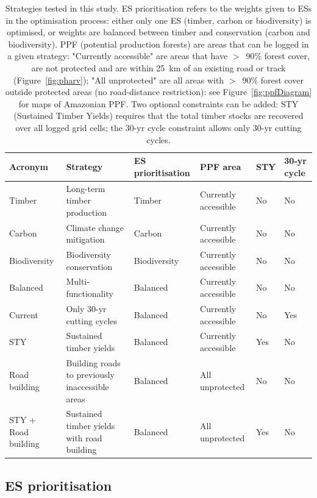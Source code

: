 \documentclass{article}
\begin{document}
\begin{table}
    \centering
    \begin{tabularx}{\textwidth}{p{2cm} p{4.5cm} p{2cm} p{3.5cm} p{0.8cm} p{1cm}}
    \toprule
         Acronym & Strategy & ES prioritisation & PPF area &  STY & 30-yr cycle \\
         \midrule
         Timber & Long-term timber production & Timber  & Currently accessible & No & No\\
         Carbon & Climate change mitigation &  Carbon & Currently accessible & No & No\\
         Biodiversity & Biodiversity conservation &  Biodiversity & Currently accessible & No & No \\
         Balanced & Multi-functionality & Balanced & Currently accessible & No & No \\
         Current & Only 30-yr cutting cycles & Balanced & Currently accessible & No & Yes \\
         STY & Sustained timber yields & Balanced & Currently accessible & Yes & No \\
         Road building & Building roads to previously inaccessible areas & Balanced & All unprotected & No & No \\
         STY + Road building & Sustained timber yields with road building & Balanced & All unprotected & Yes & No \\
         \bottomrule
    \end{tabularx}
    \caption{Strategies tested in this study. ES prioritisation refers to the weights given to ESs in the optimisation process: either only one ES (timber, carbon or biodiversity) is optimised, or weights are balanced between timber and conservation (carbon and biodiversity). PPF (potential production forests) are areas that can be logged in a given strategy: "Currently accessible" are areas that have $>$~90\% forest cover, are not protected and are within 25~km of an existing road or track (Figure~\ref{fig:pharv}); "All unprotected" are all areas with $>$~90\% forest cover outside protected areas (no road-distance restriction): see Figure~\ref{fig:ppfDiagram} for maps of Amazonian PPF. Two optional constraints can be added: STY (Sustained Timber Yields) requires that the total timber stocks are recovered over all logged grid cells; the 30-yr cycle constraint allows only 30-yr cutting cycles.}
    \label{tab:strategies}
\end{table}

\subsection{ES prioritisation}
\end{document}
